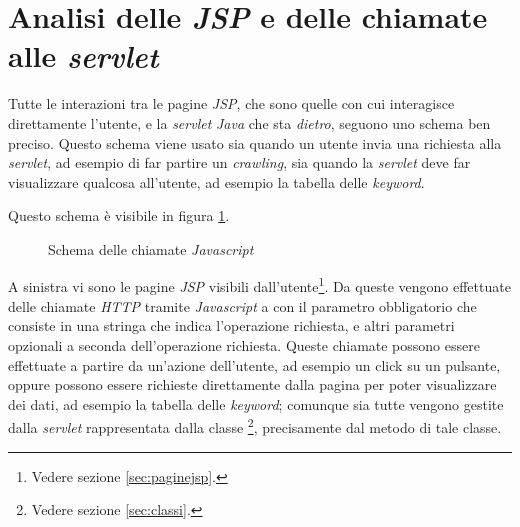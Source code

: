 \documentclass[tesi.tex]{subfiles}
\begin{document}
\section{Analisi delle \emph{JSP} e delle chiamate alle \emph{servlet}}\label{sec:analisijsp}
Tutte le interazioni tra le pagine \emph{JSP}, che sono quelle con cui
interagisce direttamente l'utente, e la \emph{servlet} \emph{Java} che
sta \emph{dietro}, seguono uno schema ben preciso. Questo schema viene
usato sia quando un utente invia una richiesta alla \emph{servlet}, ad
esempio di far partire un \emph{crawling}, sia quando la
\emph{servlet} deve far visualizzare qualcosa all'utente, ad esempio
la tabella delle \emph{keyword}.

Questo schema \`e visibile in figura \ref{fig:chiamatejs}.
\begin{figure}
  \begin{center}
  \end{center}
  \caption{Schema delle chiamate \emph{Javascript}}
  \label{fig:chiamatejs}
\end{figure}
A sinistra vi sono le pagine \emph{JSP} visibili
dall'utente\footnote{Vedere sezione \ref{sec:paginejsp}.}. Da queste
vengono effettuate delle chiamate \emph{HTTP} tramite \emph{Javascript} a
 con il
parametro obbligatorio  che consiste in una stringa
che indica l'operazione richiesta, e altri parametri opzionali a
seconda dell'operazione richiesta. Queste chiamate possono essere
effettuate a partire da un'azione dell'utente, ad esempio un click su
un pulsante, oppure possono essere richieste direttamente dalla pagina
per poter visualizzare dei dati, ad esempio la tabella delle
\emph{keyword}; comunque sia tutte vengono gestite dalla
\emph{servlet} rappresentata dalla classe
\footnote{Vedere sezione \ref{sec:classi}\label{note:appvediclassi}.},
precisamente dal metodo  di tale classe.
\end{document}
